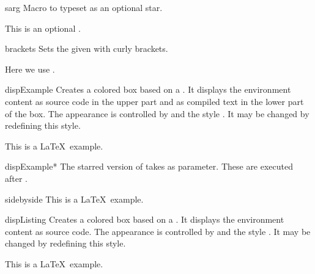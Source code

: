 \clearpage

\begin{docCommand}[doc new=2023-02-16]{sarg}{}
  Macro to typeset \sarg{} as an optional star.
\begin{dispExample}
This is an optional \sarg.
\end{dispExample}
\end{docCommand}


\begin{docCommand}{brackets}{}
  Sets the given  with curly brackets.
\begin{dispExample}
  Here we use .
\end{dispExample}
\end{docCommand}


{\let\xdispExample\dispExample
  \let\endxdispExample\enddispExample
\begin{docEnvironment}[doc updated=2014-10-10]{dispExample}{}
  Creates a colored box based on a .
  It displays the environment content as source code in the upper part
  and as compiled text in the lower part of the box.
  The appearance is controlled by 
  and the style . It may be
  changed by redefining this style.
{
\begin{xdispExample}
\begin{dispExample}
This is a \LaTeX\ example.
\end{dispExample}
\end{xdispExample}
}
\end{docEnvironment}}


{\let\xdispExample\dispExample
  \let\endxdispExample\enddispExample
\begin{docEnvironment}[doc updated=2014-10-10]{dispExample*}{}
  The starred version of  takes  
  as parameter. These  are executed after .
\begin{xdispExample}
\begin{dispExample*}{sidebyside}
This is a \LaTeX\ example.
\end{dispExample*}
\end{xdispExample}
\end{docEnvironment}}


\clearpage
\begin{docEnvironment}{dispListing}{}
  Creates a colored box based on a .
  It displays the environment content as source code.
  The appearance is controlled by 
  and the style . It may be
  changed by redefining this style.
\begin{dispExample}
\begin{dispListing}
This is a \LaTeX\ example.
\end{dispListing}
\end{dispExample}
\end{docEnvironment}

